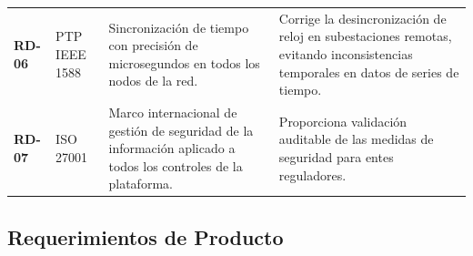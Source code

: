 \documentclass[12pt, letterpaper]{article}
\begin{document}
\begin{longtable}{
  C{1.5cm}
  P{2.8cm}
  P{5.2cm}
  P{4.2cm}
}
\textbf{RD-06} & PTP IEEE 1588 &
  Sincronización de tiempo con precisión de microsegundos en todos los nodos de la red. &
  Corrige la desincronización de reloj en subestaciones remotas, evitando inconsistencias
  temporales en datos de series de tiempo. \\

\textbf{RD-07} & ISO 27001 &
  Marco internacional de gestión de seguridad de la información aplicado a todos los controles
  de la plataforma. &
  Proporciona validación auditable de las medidas de seguridad para entes reguladores. \\

\end{longtable}

\subsection{Requerimientos de Producto}
\end{document}
